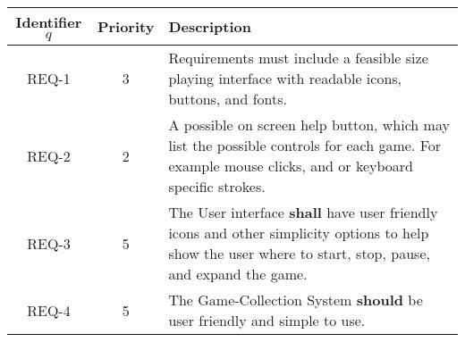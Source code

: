 \documentclass[11pt,a4paper]{article}
\begin{document}
\begin{table}[H]
  \begin{center}
  \begin{tabular}{| c | c | p{8cm} | }
  \hline
  Identifier $q$ & Priority & Description  \\ \hline
  REQ-1 & 3 & Requirements must include a feasible size playing interface with readable icons, buttons, and fonts.
\\ \hline
  REQ-2 & 2 & A possible on screen help button, which may list the possible controls for each game. For example mouse clicks, and or keyboard specific strokes. \\ \hline
  REQ-3 & 5 & The User interface \textbf{shall} have user friendly icons and other simplicity options to help show the user where to start, stop, pause, and expand the game. \\ \hline
  REQ-4 & 5 & The Game-Collection System \textbf{should} be user friendly and simple to use. \\ \hline
  
  
  \end{tabular}
\end{center}
\end{table}


\end{document}
